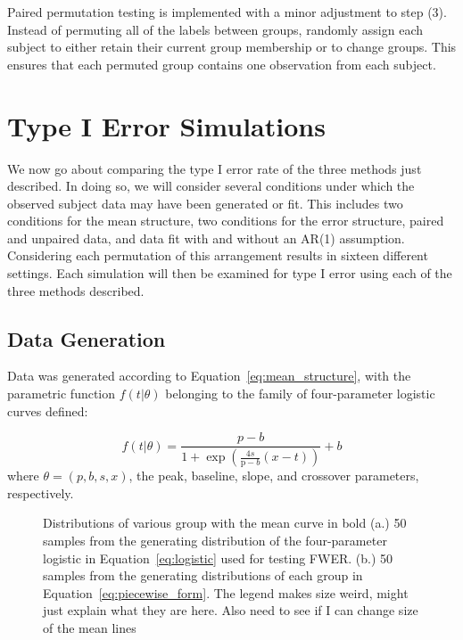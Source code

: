Paired permutation testing is implemented with a minor adjustment to step (3). Instead of permuting all of the labels between groups, randomly assign each subject to either retain their current group membership or to change groups. This ensures that each permuted group contains one observation from each subject.



\section{Type I Error Simulations}

We now go about comparing the type I error rate of the three methods just described. In doing so, we will consider several conditions under which the observed subject data may have been generated or fit. This includes two conditions for the mean structure, two conditions for the error structure, paired and unpaired data, and data fit with and without an AR(1) assumption. Considering each permutation of this arrangement results in sixteen different settings. Each simulation will then be examined for type I error using each of the three methods described.



\subsection{Data Generation}

Data was generated according to Equation~\ref{eq:mean_structure}, with the parametric function $f(t|\theta)$ belonging to the family of four-parameter logistic curves defined:

\begin{equation}\label{eq:logistic}
f(t | \theta) = \frac{p-b}{1 + \exp \left(\frac{4s}{\text{p}-b} (x - t) \right)} + b
\end{equation}
where $\theta = (p, b, s, x)$, the peak, baseline, slope, and crossover parameters, respectively.


\begin{figure}
    \centering
    \caption{Distributions of various group with the mean curve in bold (a.) 50 samples from the generating distribution of the four-parameter logistic in Equation~\ref{eq:logistic} used for testing FWER. (b.) 50 samples from the generating distributions of each group in Equation~\ref{eq:piecewise_form}. The legend makes size weird, might just explain what they are here. Also need to see if I can change size of the mean lines}
\label{fig:distribution}
\end{figure}



